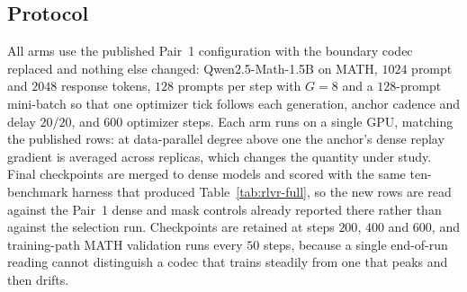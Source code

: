 \begin{revised}
\subsection{Protocol}

All arms use the published Pair~1 configuration with the boundary codec
replaced and nothing else changed: Qwen2.5-Math-1.5B on MATH, $1024$ prompt and
$2048$ response tokens, $128$ prompts per step with $G=8$ and a $128$-prompt
mini-batch so that one optimizer tick follows each generation, anchor cadence
and delay $20/20$, and $600$ optimizer steps. Each arm runs on a single GPU,
matching the published rows: at data-parallel degree above one the anchor's
dense replay gradient is averaged across replicas, which changes the quantity
under study. Final checkpoints are merged to dense models and scored with the
same ten-benchmark harness that produced Table~\ref{tab:rlvr-full}, so the new
rows are read against the Pair~1 dense and mask controls already reported there
rather than against the selection run. Checkpoints are retained at steps $200$,
$400$ and $600$, and training-path MATH validation runs every $50$ steps,
because a single end-of-run reading cannot distinguish a codec that trains
steadily from one that peaks and then drifts.
\end{revised}
